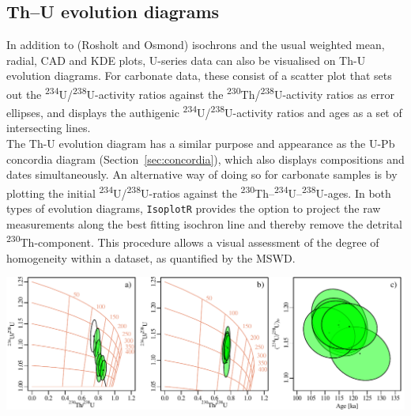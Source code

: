 \begin{refsection}
\section{Th--U evolution diagrams}\label{sec:ThUevolution}

In addition to (Rosholt and Osmond) isochrons and the usual weighted
mean, radial, CAD and KDE plots, U-series data can also be visualised
on Th-U evolution diagrams.  For carbonate data, these consist of a
scatter plot that sets out the
\textsuperscript{234}U/\textsuperscript{238}U-activity ratios against
the \textsuperscript{230}Th/\textsuperscript{238}U-activity ratios as
error ellipses, and displays the authigenic
\textsuperscript{234}U/\textsuperscript{238}U-activity ratios and ages
as a set of intersecting lines.\\

The Th-U evolution diagram has a similar purpose and appearance as the
U-Pb concordia diagram (Section~\ref{sec:concordia}), which also
displays compositions and dates simultaneously. An alternative way of
doing so for carbonate samples is by plotting the initial
\textsuperscript{234}U/\textsuperscript{238}U-ratios against the
\textsuperscript{230}Th--\textsuperscript{234}U--\textsuperscript{238}U-ages.
In both types of evolution diagrams, \texttt{IsoplotR} provides the
option to project the raw measurements along the best fitting isochron
line and thereby remove the detrital
\textsuperscript{230}Th-component. This procedure allows a visual
assessment of the degree of homogeneity within a dataset, as
quantified by the MSWD.\medskip

\noindent
\includegraphics[width=\linewidth]{../figures/evolution12.pdf}
\label{fig:evolution12}


\end{refsection}
